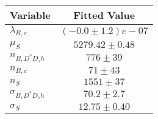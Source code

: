 \begin{tabular}[t]{lc}
\hline
Variable &Fitted Value\\
\hline\hline
$\lambda_{B,c}$&$(-0.0\pm1.2)e-07$\\
\hline
$\mu_S$&$5279.42\pm0.48$\\
\hline
$n_{B, D^* D_s h}$&$776\pm39$\\
\hline
$n_{B,c}$&$71\pm43$\\
\hline
$n_S$&$1551\pm37$\\
\hline
$\sigma_{B, D^* D_s h}$&$70.2\pm2.7$\\
\hline
$\sigma_S$&$12.75\pm0.40$\\
\hline
\end{tabular}